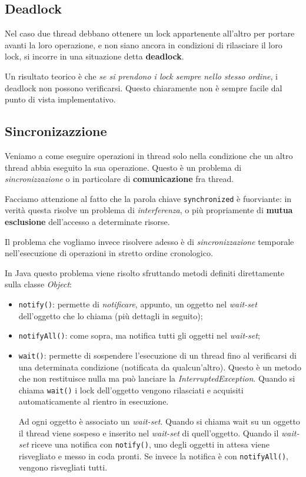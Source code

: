 \documentclass[a4paper,11pt]{article}
\begin{document}
\subsection{Deadlock}
Nel caso due thread debbano ottenere un lock appartenente all'altro per portare avanti la loro operazione, e non siano ancora in condizioni di rilasciare il loro lock, si incorre in una situazione detta \textbf{deadlock}.

Un risultato teorico è che \textit{se si prendono i lock sempre nello stesso ordine}, i deadlock non possono verificarsi. Questo chiaramente non è sempre facile dal punto di vista implementativo.

\subsection{Sincronizazzione}
Veniamo a come eseguire operazioni in thread solo nella condizione che un altro thread abbia eseguito la sua operazione.
Questo è un problema di \textit{sincronizzazione} o in particolare di \textbf{comunicazione} fra thread.

Facciamo attenzione al fatto che la parola chiave \lstinline|synchronized| è fuorviante: in verità questa risolve un problema di \textit{interferenza}, o più propriamente di \textbf{mutua esclusione} dell'accesso a determinate risorse.

Il problema che vogliamo invece risolvere adesso è di \textit{sincronizzazione} temporale nell'esecuzione di operazioni in stretto ordine cronologico.

In Java questo problema viene risolto sfruttando metodi definiti direttamente sulla classe \textit{Object}:
\begin{itemize}
	\item \lstinline|notify()|: permette di \textit{notificare}, appunto, un oggetto nel \textit{wait-set} dell'oggetto che lo chiama (più dettagli in seguito);
	\item \lstinline|notifyAll()|: come sopra, ma notifica tutti gli oggetti nel \textit{wait-set}; 
	\item \lstinline|wait()|: permette di sospendere l'esecuzione di un thread fino al verificarsi di una determinata condizione (notificata da qualcun'altro). Questo è un metodo che non restituisce nulla ma può lanciare la \textit{InterruptedException}.
		Quando si chiama \lstinline|wait()| i lock dell'oggetto vengono rilasciati e acquisiti automaticamente al rientro in esecuzione.

		Ad ogni oggetto è associato un \textit{wait-set}. Quando si chiama wait su un oggetto il thread viene sospeso e inserito nel \textit{wait-set} di quell'oggetto.
		Quando il \textit{wait-set} riceve una notifica con \lstinline|notify()|, uno degli oggetti in attesa viene risvegliato e messo in coda pronti.
		Se invece la notifica è con \lstinline|notifyAll()|, vengono risvegliati tutti.
\end{itemize}
\end{document}
